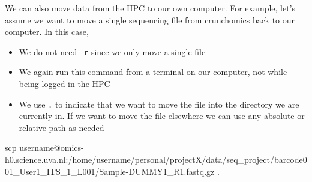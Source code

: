 \documentclass[
  letterpaper,
  DIV=11,
  numbers=noendperiod]{scrreprt}
\newenvironment{Shaded}{}{}
\newcommand{\FunctionTok}[1]{\textcolor[rgb]{0.44,0.26,0.76}{#1}}
\newcommand{\NormalTok}[1]{\textcolor[rgb]{0.14,0.16,0.18}{#1}}
\providecommand{\tightlist}{%
  \setlength{\itemsep}{0pt}\setlength{\parskip}{0pt}}\usepackage{longtable,booktabs,array}
\begin{document}
\begin{tcolorbox}[enhanced jigsaw, colframe=quarto-callout-tip-color-frame, breakable, opacityback=0, toptitle=1mm, left=2mm, coltitle=black, colbacktitle=quarto-callout-tip-color!10!white, title=\textcolor{quarto-callout-tip-color}{\faLightbulb}\hspace{0.5em}{Tip: Moving data from the HPC to our own computer}, rightrule=.15mm, bottomtitle=1mm, titlerule=0mm, colback=white, arc=.35mm, toprule=.15mm, bottomrule=.15mm, leftrule=.75mm, opacitybacktitle=0.6]

We can also move data from the HPC to our own computer. For example,
let's assume we want to move a single sequencing file from crunchomics
back to our computer. In this case,

\begin{itemize}
\tightlist
\item
  We do not need \texttt{-r} since we only move a single file
\item
  We again run this command from a terminal on our computer, not while
  being logged in the HPC
\item
  We use \texttt{.} to indicate that we want to move the file into the
  directory we are currently in. If we want to move the file elsewhere
  we can use any absolute or relative path as needed
\end{itemize}

\begin{Shaded}
\begin{Highlighting}[]
\FunctionTok{scp}\NormalTok{ username@omics{-}h0.science.uva.nl:/home/username/personal/projectX/data/seq\_project/barcode001\_User1\_ITS\_1\_L001/Sample{-}DUMMY1\_R1.fastq.gz .}
\end{Highlighting}
\end{Shaded}

\end{tcolorbox}
\end{document}
